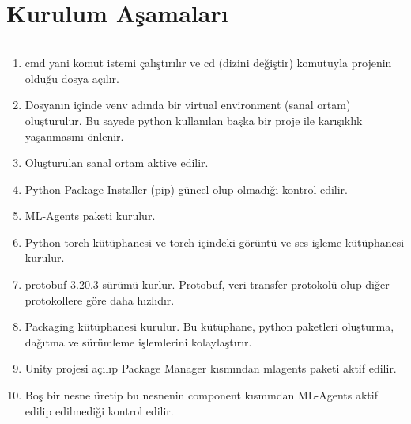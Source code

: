 \documentclass{article}
\begin{document}
\section{Kurulum Aşamaları}
\rule{\textwidth}{0.5pt}
\begin{enumerate}
    \item cmd yani komut istemi çalıştırılır ve cd (dizini değiştir) komutuyla projenin olduğu dosya açılır.
    
    \item Dosyanın içinde venv adında bir virtual environment (sanal ortam) oluşturulur. Bu sayede python kullanılan başka bir proje ile karışıklık yaşanmasını önlenir.
    
    \item Oluşturulan sanal ortam aktive edilir.
    
    \item Python Package Installer (pip) güncel olup olmadığı kontrol edilir.
    
    \item ML-Agents paketi kurulur.

    \item Python torch kütüphanesi ve torch içindeki görüntü ve ses işleme kütüphanesi kurulur.
    
    \item protobuf 3.20.3 sürümü kurlur. Protobuf, veri transfer protokolü olup diğer protokollere göre daha hızlıdır.
    
    \item Packaging kütüphanesi kurulur. Bu kütüphane, python paketleri oluşturma, dağıtma ve sürümleme işlemlerini kolaylaştırır.
    
    \item Unity projesi açılıp Package Manager kısmından mlagents paketi aktif edilir.
    
    \item Boş bir nesne üretip bu nesnenin component kısmından ML-Agents aktif edilip edilmediği kontrol edilir.
    
\end{enumerate}

\newpage
\end{document}

